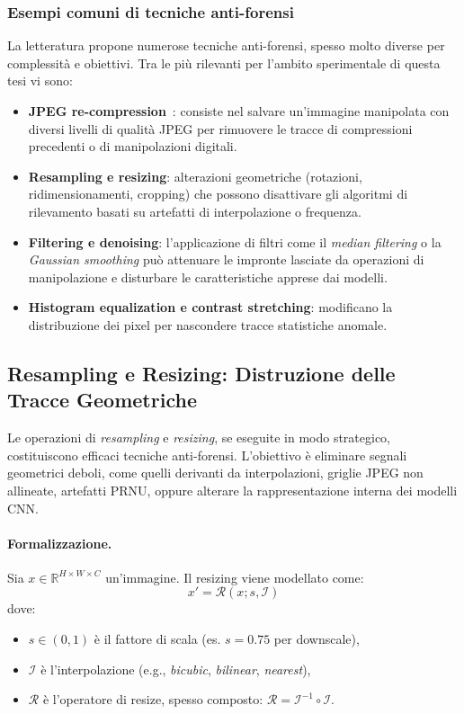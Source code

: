 \subsubsection*{Esempi comuni di tecniche anti-forensi}

La letteratura propone numerose tecniche anti-forensi, spesso molto diverse per complessità e obiettivi. Tra le più rilevanti per l’ambito sperimentale di questa tesi vi sono:

\begin{itemize}
    \item \textbf{JPEG re-compression}~\cite{barni2018cf}: consiste nel salvare un’immagine manipolata con diversi livelli di qualità JPEG per rimuovere le tracce di compressioni precedenti o di manipolazioni digitali.
    \item \textbf{Resampling e resizing}: alterazioni geometriche (rotazioni, ridimensionamenti, cropping) che possono disattivare gli algoritmi di rilevamento basati su artefatti di interpolazione o frequenza.
    \item \textbf{Filtering e denoising}: l’applicazione di filtri come il \textit{median filtering} o la \textit{Gaussian smoothing} può attenuare le impronte lasciate da operazioni di manipolazione e disturbare le caratteristiche apprese dai modelli.
    \item \textbf{Histogram equalization e contrast stretching}: modificano la distribuzione dei pixel per nascondere tracce statistiche anomale.
\end{itemize}








\subsection{Resampling e Resizing: Distruzione delle Tracce Geometriche}
\label{sec:resampling_resizing}

Le operazioni di \textit{resampling} e \textit{resizing}, se eseguite in modo strategico, costituiscono efficaci tecniche anti-forensi. L’obiettivo è eliminare segnali geometrici deboli, come quelli derivanti da interpolazioni, griglie JPEG non allineate, artefatti PRNU, oppure alterare la rappresentazione interna dei modelli CNN.

\paragraph{Formalizzazione.}
Sia $x \in \mathbb{R}^{H \times W \times C}$ un’immagine. Il resizing viene modellato come:
\[
x' = \mathcal{R}(x; s, \mathcal{I})
\]
dove:
\begin{itemize}
    \item $s \in (0,1)$ è il fattore di scala (es. $s = 0.75$ per downscale),
    \item $\mathcal{I}$ è l’interpolazione (e.g., \textit{bicubic}, \textit{bilinear}, \textit{nearest}),
    \item $\mathcal{R}$ è l’operatore di resize, spesso composto: $\mathcal{R} = \mathcal{I}^{-1} \circ \mathcal{I}$.
\end{itemize}

